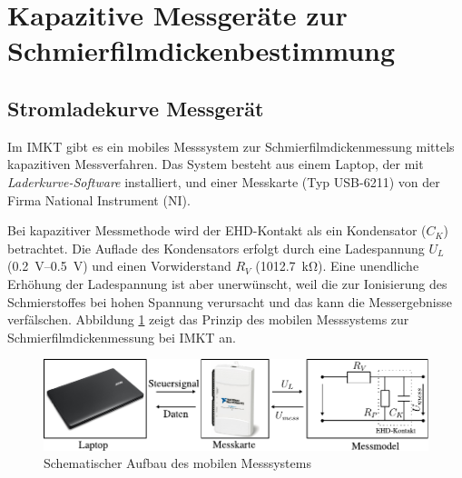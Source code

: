 \section{Kapazitive Messgeräte zur Schmierfilmdickenbestimmung}
\label{sec:kapazitive_messgeraete_zur_schmierfilmdickenbestimmung}

\subsection{Stromladekurve Messgerät}
\label{sub:stromladekurve_messgeraet}

Im IMKT gibt es ein mobiles Messsystem zur Schmierfilmdickenmessung mittels kapazitiven Messverfahren.
Das System besteht aus einem Laptop, der mit \textit{Laderkurve-Software} installiert, und einer Messkarte (Typ USB-6211) von der Firma National Instrument (NI).

Bei kapazitiver Messmethode wird der EHD-Kontakt als ein Kondensator ($C_K$) betrachtet.
Die Auflade des Kondensators erfolgt durch eine Ladespannung $U_L$ (\SIrange{0,2}{0,5}{\volt}) und einen Vorwiderstand $R_V$ (\SI{1012.7}{\kilo\ohm}).
Eine unendliche Erhöhung der Ladespannung ist aber unerwünscht, weil die zur Ionisierung des Schmierstoffes bei hohen Spannung verursacht und das kann die Messergebnisse verfälschen.
Abbildung \ref{fig:Schematischer_aufbau_des_mobilen_messsystems} zeigt das Prinzip des mobilen Messsystems zur Schmierfilmdickenmessung bei IMKT an.
\begin{figure}[htb]
    \centering
    \includegraphics[]{./images/schematischer_aufbau_des_mobilen_messsystem.pdf}
    \caption{Schematischer Aufbau des mobilen Messsystems}
    \label{fig:Schematischer_aufbau_des_mobilen_messsystems}
\end{figure}

